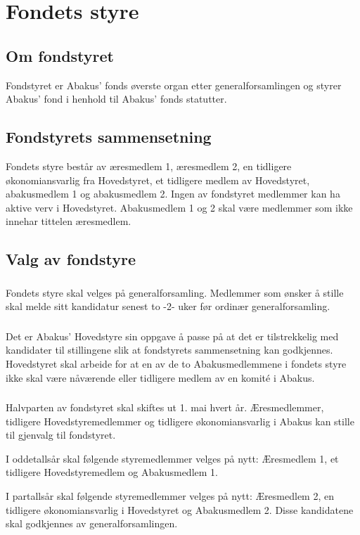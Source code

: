 \section{Fondets styre}
\subsection{Om fondstyret}
Fondstyret er Abakus’ fonds øverste organ etter generalforsamlingen og styrer
Abakus’ fond i henhold til Abakus’ fonds statutter.

\subsection{Fondstyrets sammensetning}
Fondets styre består av æresmedlem 1, æresmedlem 2, en tidligere økonomiansvarlig fra 
Hovedstyret, et tidligere medlem av Hovedstyret, abakusmedlem 1 og abakusmedlem 2.
Ingen av fondstyret medlemmer kan ha aktive verv i Hovedstyret. Abakusmedlem 1 og 2 skal 
være medlemmer som ikke innehar tittelen æresmedlem. 

\subsection{Valg av fondstyre}
\subsubsection{}
Fondets styre skal velges på generalforsamling. Medlemmer som ønsker å stille skal melde 
sitt kandidatur senest to -2- uker før ordinær generalforsamling. 

\subsubsection{}
Det er Abakus’ Hovedstyre sin oppgave å passe på at det er tilstrekkelig med kandidater til 
stillingene slik at fondstyrets sammensetning kan godkjennes. Hovedstyret skal arbeide for 
at en av de to Abakusmedlemmene i fondets styre ikke skal være nåværende eller tidligere 
medlem av en komité i Abakus.

\subsubsection{}
Halvparten av fondstyret skal skiftes ut 1. mai hvert år. Æresmedlemmer, tidligere 
Hovedstyremedlemmer og tidligere økonomiansvarlig i Abakus kan stille til gjenvalg til 
fondstyret.

I oddetallsår skal følgende styremedlemmer velges på nytt: Æresmedlem 1, et tidligere 
Hovedstyremedlem og Abakusmedlem 1. 

I partallsår skal følgende styremedlemmer velges på nytt: Æresmedlem 2, en tidligere 
økonomiansvarlig i Hovedstyret og Abakusmedlem 2. 
Disse kandidatene skal godkjennes av generalforsamlingen. 
